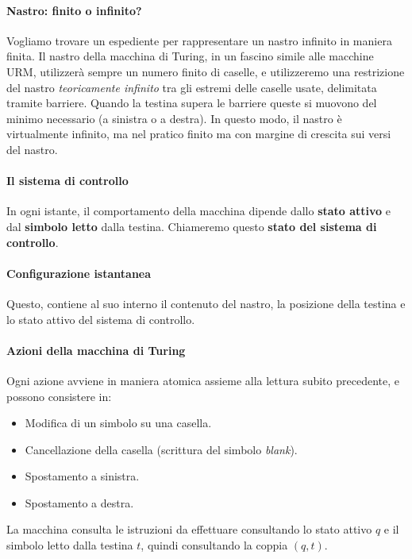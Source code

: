\paragraph{Nastro: finito o infinito?}
Vogliamo trovare un espediente per rappresentare un nastro infinito in maniera finita. Il nastro della macchina di Turing, in un fascino simile alle macchine URM, utilizzerà sempre un numero finito di caselle, e utilizzeremo una restrizione del nastro \textit{teoricamente infinito} tra gli estremi delle caselle usate, delimitata tramite barriere. Quando la testina supera le barriere  queste si muovono del minimo necessario (a sinistra o a destra). In questo modo, il nastro è virtualmente infinito, ma nel pratico finito ma con margine di crescita sui versi del nastro.

\paragraph{Il sistema di controllo}
In ogni istante, il comportamento della macchina dipende dallo \textbf{stato attivo} e dal \textbf{simbolo letto} dalla testina. Chiameremo questo \textbf{stato del sistema di controllo}.

\paragraph{Configurazione istantanea}
Questo, contiene al suo interno il contenuto del nastro, la posizione della testina e lo stato attivo del sistema di controllo.

\paragraph{Azioni della macchina di Turing}
Ogni azione avviene in maniera atomica assieme alla lettura subito precedente, e possono consistere in:
\begin{itemize}
	\item Modifica di un simbolo su una casella.
	\item Cancellazione della casella (scrittura del simbolo \textit{blank}).
	\item Spostamento a sinistra.
	\item Spostamento a destra.
\end{itemize}

La macchina consulta le istruzioni da effettuare consultando lo stato attivo $q$ e il simbolo letto dalla testina $t$, quindi consultando la coppia $(q,t)$.

